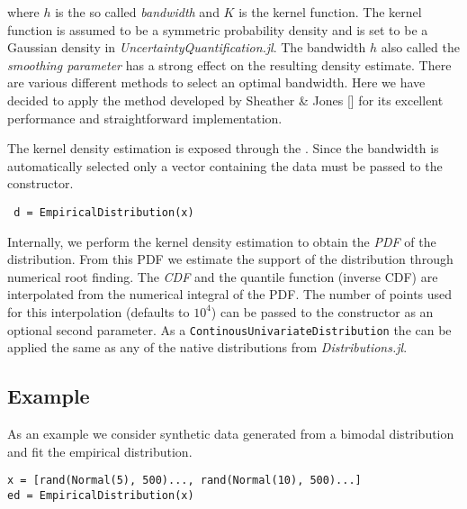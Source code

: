 where \(h\) is the so called \emph{bandwidth} and \(K\) is the kernel function. The kernel function is assumed to be a symmetric probability density and is set to be a Gaussian density in \emph{UncertaintyQuantification.jl}. The bandwidth \(h\) also called the \emph{smoothing parameter} has a strong effect on the resulting density estimate. There are various different methods to select an optimal bandwidth. Here we have decided to apply the method developed by Sheather \& Jones [] for its excellent performance and straightforward implementation.



The kernel density estimation is exposed through the . Since the bandwidth is automatically selected only a vector containing the data must be passed to the constructor.




\begin{verbatim}
 d = EmpiricalDistribution(x)
\end{verbatim}



Internally, we perform the kernel density estimation to obtain the \emph{PDF} of the distribution. From this PDF we estimate the support of the distribution through numerical root finding. The \emph{CDF} and the quantile function (inverse CDF) are interpolated from the numerical integral of the PDF. The number of points used for this interpolation (defaults to \(10^4\)) can be passed to the constructor as an optional second parameter. As a \texttt{ContinousUnivariateDistribution} the  can be applied the same as any of the native distributions from \emph{Distributions.jl}.



\subsection{Example}



\label{12204569949998619624}{}


As an example we consider synthetic data generated from a bimodal distribution and fit the empirical distribution.




\begin{verbatim}
x = [rand(Normal(5), 500)..., rand(Normal(10), 500)...]
ed = EmpiricalDistribution(x)
\end{verbatim}



